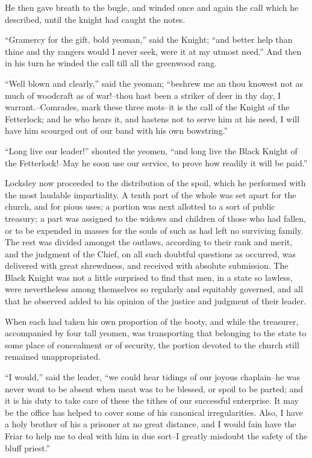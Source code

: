 He then gave breath to the bugle, and winded once and again the call
which he described, until the knight had caught the notes.

``Gramercy for the gift, bold yeoman,'' said the Knight; ``and better
help than thine and thy rangers would I never seek, were it at my utmost
need.'' And then in his turn he winded the call till all the greenwood
rang.

``Well blown and clearly,'' said the yeoman; ``beshrew me an thou
knowest not as much of woodcraft as of war!--thou hast been a striker of
deer in thy day, I warrant.--Comrades, mark these three mots--it is the
call of the Knight of the Fetterlock; and he who hears it, and hastens
not to serve him at his need, I will have him scourged out of our band
with his own bowstring.''

``Long live our leader!'' shouted the yeomen, ``and long live the Black
Knight of the Fetterlock!--May he soon use our service, to prove how
readily it will be paid.''

Locksley now proceeded to the distribution of the spoil, which he
performed with the most laudable impartiality. A tenth part of the whole
was set apart for the church, and for pious uses; a portion was next
allotted to a sort of public treasury; a part was assigned to the widows
and children of those who had fallen, or to be expended in masses for
the souls of such as had left no surviving family. The rest was divided
amongst the outlaws, according to their rank and merit, and the judgment
of the Chief, on all such doubtful questions as occurred, was delivered
with great shrewdness, and received with absolute submission. The Black
Knight was not a little surprised to find that men, in a state so
lawless, were nevertheless among themselves so regularly and equitably
governed, and all that he observed added to his opinion of the justice
and judgment of their leader.

When each had taken his own proportion of the booty, and while the
treasurer, accompanied by four tall yeomen, was transporting that
belonging to the state to some place of concealment or of security, the
portion devoted to the church still remained unappropriated.

``I would,'' said the leader, ``we could hear tidings of our joyous
chaplain--he was never wont to be absent when meat was to be blessed, or
spoil to be parted; and it is his duty to take care of these the tithes
of our successful enterprise. It may be the office has helped to cover
some of his canonical irregularities. Also, I have a holy brother of his
a prisoner at no great distance, and I would fain have the Friar to help
me to deal with him in due sort--I greatly misdoubt the safety of the
bluff priest.''

